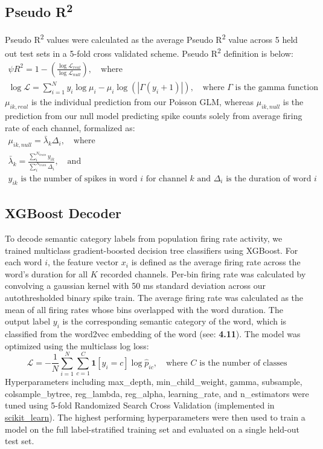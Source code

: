 \documentclass[pdflatex,sn-basic]{sn-jnl}%
\theoremstyle{thmstyleone}%
\theoremstyle{thmstyletwo}%
\theoremstyle{thmstylethree}%
\begin{document}
\subsection{Pseudo R\textsuperscript{2}}\label{subsec9}
Pseudo R\textsuperscript{2} values were calculated as the average Pseudo R\textsuperscript{2} value across 5 held out test sets in a 5-fold cross validated scheme. Pseudo R\textsuperscript{2} definition is below:
\begin{gather*}
\psi R^2=1-\left(\frac{\log\mathcal{L}_\mathit{real}}{\log\mathcal{L}_\mathit{null}}\right), \quad\text{where}\\
\log\mathcal{L}=\sum_{i=1}^{N}y_i\log\mu_i-\mu_i\log(|\Gamma(y_i+1)|), \quad\text{where $\Gamma$ is the gamma function}
\end{gather*}
$\mu_{ik,\mathit{real}}$ is the individual prediction from our Poisson GLM, whereas $\mu_{ik,\mathit{null}}$ is the prediction from our null model predicting spike counts solely from average firing rate of each channel, formalized as:
\begin{gather*}
\mu_{ik,\mathit{null}}=\bar{\lambda}_k\Delta_i, \quad \text{where}\\
\bar{\lambda}_k=\frac{\sum_i^{N_\mathit{train}}y_{ik}}{\sum_i^{N_\mathit{train}}\Delta_i}, \quad\text{and}\\
\text{$y_{ik}$ is the number of spikes in word $i$ for channel $k$ and $\Delta_i$ is the duration of word $i$}
\end{gather*}

\subsection{XGBoost Decoder}\label{subsec10}
To decode semantic category labels from population firing rate activity, we trained multiclass gradient-boosted decision tree classifiers using XGBoost. For each word $i$, the feature vector $x_i$ is defined as the average firing rate across the word’s duration for all $K$ recorded channels. Per-bin firing rate was calculated by convolving a gaussian kernel with 50 ms standard deviation across our autothresholded binary spike train. The average firing rate was calculated as the mean of all firing rates whose bins overlapped with the word duration. The output label $y_i$ is the corresponding semantic category of the word, which is classified from the word2vec embedding of the word (see: \textbf{4.11}). The model was optimized using the multiclass log loss:
\[
\mathcal{L}=-\frac{1}{N}\sum_{i=1}^N\sum_{c=1}^C\mathbf{1}[y_i=c]\log\hat{p}_{ic},\quad\text{where $C$ is the number of classes}
\]
Hyperparameters including max\_depth, min\_child\_weight, gamma, subsample, colsample\_bytree, reg\_lambda, reg\_alpha, learning\_rate, and n\_estimators were tuned using 5-fold Randomized Search Cross Validation (implemented in \href{https://scikit-learn.org}{scikit\_learn}). The highest performing hyperparameters were then used to train a model on the full label-stratified training set and evaluated on a single held-out test set.
\end{document}
